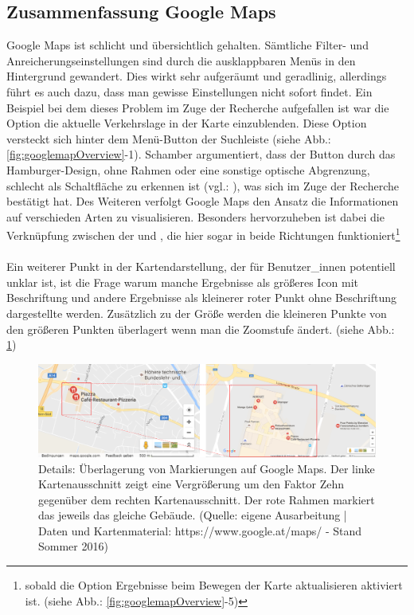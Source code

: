 \documentclass[../Bachelorarbeit.tex]{subfiles}
\begin{document}
\subsection{Zusammenfassung Google Maps}
Google Maps ist schlicht und übersichtlich gehalten.
Sämtliche Filter- und Anreicherungseinstellungen sind durch die ausklappbaren Menüs in den Hintergrund gewandert.
Dies wirkt sehr aufgeräumt und geradlinig, allerdings führt es auch dazu, dass man gewisse Einstellungen nicht sofort findet.
Ein Beispiel bei dem dieses Problem im Zuge der Recherche aufgefallen ist war die Option die aktuelle Verkehrslage in der Karte einzublenden.
Diese Option versteckt sich hinter dem Menü-Button der Suchleiste (siehe Abb.: \ref{fig:googlemapOverview}-1). 
Schamber argumentiert, dass der Button durch das Hamburger-Design, ohne Rahmen oder eine sonstige optische Abgrenzung, schlecht als Schaltfläche zu erkennen ist (vgl.: \cite{SchamberHamburgerIcon}), was sich im Zuge der Recherche bestätigt hat.
Des Weiteren verfolgt Google Maps den Ansatz die Informationen auf verschieden Arten zu visualisieren. 
Besonders hervorzuheben ist dabei die Verknüpfung zwischen der  und , die hier sogar in beide Richtungen funktioniert\footnote{sobald die Option Ergebnisse beim Bewegen der Karte aktualisieren aktiviert ist. (siehe Abb.: \ref{fig:googlemapOverview}-5)}\\
\\
Ein weiterer Punkt in der Kartendarstellung, der für Benutzer\_innen potentiell unklar ist, ist die Frage warum manche Ergebnisse als größeres Icon mit Beschriftung und andere Ergebnisse als kleinerer roter Punkt ohne Beschriftung dargestellte werden. 
Zusätzlich zu der Größe werden die kleineren Punkte von den größeren Punkten überlagert wenn man die Zoomstufe ändert. (siehe Abb.: \ref{fig:googlemapDetail})


\begin{figure}[H]
\centering
\includegraphics[width=1\linewidth]{img/StandDerTechnik/googlemapDetail}
\caption[Details: Überlagerung von Markierungen auf Google Maps]{Details: Überlagerung von Markierungen auf Google Maps. Der linke Kartenausschnitt zeigt eine Vergrößerung um den Faktor Zehn gegenüber dem rechten Kartenausschnitt. Der rote Rahmen markiert das jeweils das gleiche Gebäude. (Quelle: eigene Ausarbeitung | Daten und Kartenmaterial: https://www.google.at/maps/ - Stand Sommer 2016)}
\label{fig:googlemapDetail}
\end{figure}
\end{document}
